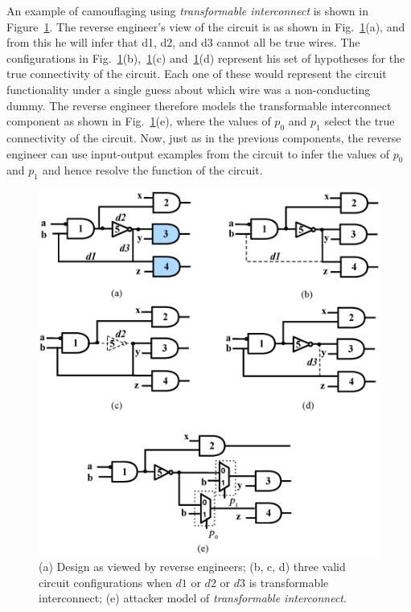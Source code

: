 \documentclass[proposal]{umassthesis}  %
\begin{document}
An example of camouflaging using \textit{transformable interconnect} is shown in Figure~\ref{fig:dummywire}. The reverse engineer's view of the circuit is as shown in Fig.~\ref{fig:dummywire}(a), and from this he will infer that d1, d2, and d3 cannot all be true wires. The configurations in Fig.~\ref{fig:dummywire}(b),~\ref{fig:dummywire}(c) and~\ref{fig:dummywire}(d) represent his set of hypotheses for the true connectivity of the circuit. Each one of these would represent the circuit functionality under a single guess about which wire was a non-conducting dummy. The reverse engineer therefore models the transformable interconnect component as shown in Fig.~\ref{fig:dummywire}(e), where the values of $p_0$ and $p_1$ select the true connectivity of the circuit. Now, just as in the previous components, the reverse engineer can use input-output examples from the circuit to infer the values of $p_0$ and $p_1$ and hence resolve the function of the circuit. 


\begin{figure}[t] 
\begin{center}
\includegraphics[scale=0.5]{figures/dummywire.eps}
\caption{(a) Design as viewed by reverse engineers; (b, c, d) three valid circuit configurations when $d1$ or $d2$ or $d3$ is transformable interconnect; (e) attacker model of \textit{transformable interconnect}.}
\label{fig:dummywire}
\end{center}
\end{figure}
\end{document}
